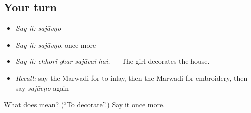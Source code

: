 \subsection*{Your turn}
\begin{itemize}
\raggedright
  \item \emph{Say it:} \emph{sajāvṇo}
  \item \emph{Say it:} \emph{sajāvṇo}, once more
  \item \emph{Say it:} \emph{chhorī ghar sajāvai hai.} — The girl decorates the house.
  \item \emph{Recall:} say the Marwadi for to inlay, then the Marwadi for embroidery, then say \emph{sajāvṇo} again
\end{itemize}

\begin{tcolorbox}[breakable,colback=teal!4,colframe=teal!35!black,title={Before you move on}]
What does  mean? (\textquotedblleft{}To decorate\textquotedblright{}.) Say it once more.
\end{tcolorbox}
